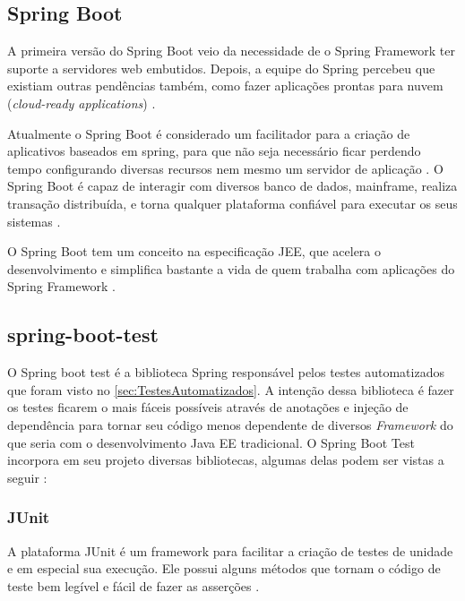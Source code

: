 \subsection{Spring Boot}\label{subsec:SpringBoot}

A primeira versão do Spring Boot veio da necessidade de o Spring Framework ter suporte a servidores web embutidos. Depois, a equipe do Spring percebeu que existiam outras pendências também, como fazer aplicações prontas para nuvem (\textit{cloud-ready applications}) \cite{Boagrio:2017}.

Atualmente o Spring Boot é considerado um facilitador para a criação de aplicativos baseados em spring, para que não seja necessário ficar perdendo tempo configurando diversas recursos nem mesmo um servidor de aplicação \cite{springBoot:2017}. O Spring Boot é capaz de interagir com diversos banco de dados, mainframe, realiza transação distribuída, e torna qualquer plataforma confiável para executar os seus sistemas \cite{Boagrio:2017}.

O Spring Boot tem um conceito na especificação JEE, que acelera o desenvolvimento e simplifica bastante a vida de quem trabalha com aplicações do Spring Framework \cite{Boagrio:2017}.

\subsection{spring-boot-test}\label{subsec:SpringTest}

O Spring boot test é a biblioteca Spring responsável pelos testes automatizados que foram  visto no \autoref{sec:TestesAutomatizados}. A intenção dessa biblioteca é fazer os testes ficarem o mais fáceis possíveis através de anotações e injeção de dependência para tornar seu código menos dependente de diversos \textit{Framework} do que seria com o desenvolvimento Java EE tradicional. 
O Spring Boot Test incorpora em seu projeto diversas bibliotecas, algumas delas podem ser vistas a seguir \cite{springBootTest:2017}:

\subsubsection{JUnit}\label{subsec:JUnit}
	
	A plataforma JUnit é um framework para facilitar a criação de testes de unidade e em especial sua execução. Ele possui alguns métodos que tornam o código de teste bem legível e fácil de fazer as asserções \cite{junit:2017}.

